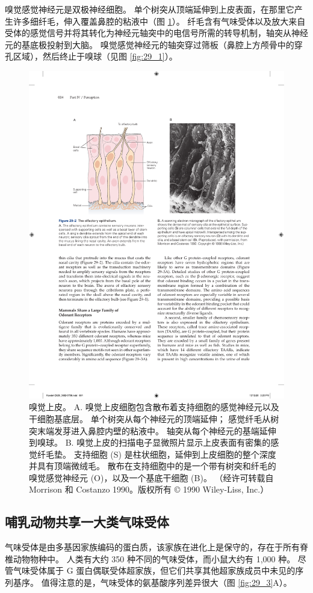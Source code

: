 嗅觉感觉神经元是双极神经细胞。 
单个树突从顶端延伸到上皮表面，在那里它产生许多细纤毛，伸入覆盖鼻腔的粘液中（图 \ref{fig:29_2}）。
纤毛含有气味受体以及放大来自受体的感觉信号并将其转化为神经元轴突中的电信号所需的转导机制，轴突从神经元的基底极投射到大脑。 嗅觉感觉神经元的轴突穿过筛板（鼻腔上方颅骨中的穿孔区域），然后终止于嗅球（见图 \ref{fig:29_1}）。

\begin{figure}[htbp]
	\centering
	\includegraphics[width=0.8\linewidth]{chap29/fig_29_2}
	\caption{嗅觉上皮。 A. 嗅觉上皮细胞包含散布着支持细胞的感觉神经元以及干细胞基底层。 单个树突从每个神经元的顶端延伸； 感觉纤毛从树突末端发芽进入鼻腔内壁的粘液中。 轴突从每个神经元的基端延伸到嗅球。 B. 嗅觉上皮的扫描电子显微照片显示上皮表面有密集的感觉纤毛垫。 支持细胞 (S) 是柱状细胞，延伸到上皮细胞的整个深度并具有顶端微绒毛。 散布在支持细胞中的是一个带有树突和纤毛的嗅觉感觉神经元 (O)，以及一个基底干细胞 (B)。 （经许可转载自 Morrison 和 Costanzo 1990。版权所有 © 1990 Wiley-Liss, Inc.）}
	\label{fig:29_2}
\end{figure}


\subsection{哺乳动物共享一大类气味受体}
气味受体是由多基因家族编码的蛋白质，该家族在进化上是保守的，存在于所有脊椎动物物种中。 人类有大约 350 种不同的气味受体，而小鼠大约有 1,000 种。 
尽管气味受体属于 G 蛋白偶联受体超家族，但它们共享其他超家族成员中未见的序列基序。 
值得注意的是，气味受体的氨基酸序列差异很大（图 \ref{fig:29_3}A）。

